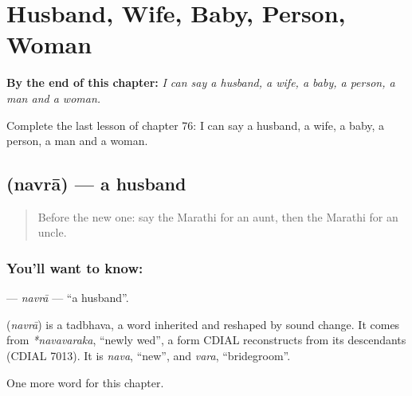 
\chapter{Husband, Wife, Baby, Person, Woman}
\label{ch:mr-husband-wife-baby-person-woman}

\begin{chapteropening}
\textbf{By the end of this chapter:} \emph{I can say a husband, a wife, a baby, a person, a man and a woman.}

Complete the last lesson of chapter 76: I can say a husband, a wife, a baby, a person, a man and a woman.
\end{chapteropening}

\section[\texorpdfstring{\mr{नवरा} (navrā)}{नवरा (navrā)}]{ (navrā) — a husband}

\label{lesson:MR-C76-navra}



\begin{quote}
Before the new one: say the Marathi for an aunt, then the Marathi for an uncle.
\end{quote}

\subsection*{You'll want to know: }
\textbf{} — \emph{navrā} — \textquotedblleft{}a husband\textquotedblright{}.

\begin{cousinweb}
\textbf{} (\emph{navrā}) is a tadbhava, a word inherited and reshaped by sound change. It comes from \emph{*navavaraka}, \textquotedblleft{}newly wed\textquotedblright{}, a form CDIAL reconstructs from its descendants (CDIAL 7013). It is \emph{nava}, \textquotedblleft{}new\textquotedblright{}, and \emph{vara}, \textquotedblleft{}bridegroom\textquotedblright{}.
\end{cousinweb}

\begin{grammarlens}[title={What you've built}]
One more word for this chapter.
\end{grammarlens}

